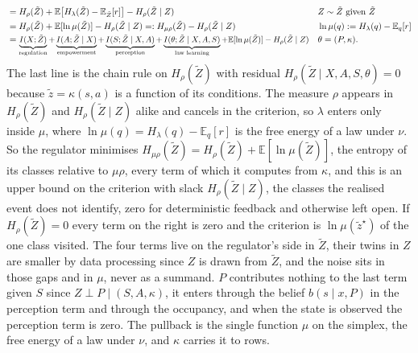 \documentclass[10pt]{article}
\begin{document}
{\begin{align*}
           &= H_\rho(\tilde Z) + \mathbb E\big[H_\lambda(\tilde Z) - \mathbb E_{\tilde Z}[r]\big] - H_\rho(\tilde Z \mid Z) && Z \sim \tilde Z \text{ given } \tilde Z \\
           &= H_\rho(\tilde Z) + \mathbb E[\ln \mu(\tilde Z)] - H_\rho(\tilde Z \mid Z) =: H_{\mu\rho}(\tilde Z) - H_\rho(\tilde Z \mid Z) && \ln \mu(q) := H_\lambda(q) - \mathbb E_q[r] \\
           &= \scalebox{0.92}{$\displaystyle \underbrace{I(X;\tilde Z)}_{\text{regulation}} + \underbrace{I(A;\tilde Z \mid X)}_{\text{empowerment}} + \underbrace{I(S;\tilde Z \mid X,A)}_{\text{perception}} + \underbrace{I(\theta;\tilde Z \mid X,A,S)}_{\text{law learning}} + \mathbb E[\ln \mu(\tilde Z)] - H_\rho(\tilde Z \mid Z)$} && \theta = (P,\kappa).
\end{align*}
The last line is the chain rule on $H_\rho(\tilde Z)$ with residual $H_\rho(\tilde Z \mid X,A,S,\theta) = 0$ because $\tilde z = \kappa(s,a)$ is a function of its conditions.
The measure $\rho$ appears in $H_\rho(\tilde Z)$ and $H_\rho(\tilde Z \mid Z)$ alike and cancels in the criterion, so $\lambda$ enters only inside $\mu$, where $\ln \mu(q) = H_\lambda(q) - \mathbb E_q[r]$ is the free energy of a law under $\nu$.
So the regulator minimises $H_{\mu\rho}(\tilde Z) = H_\rho(\tilde Z) + \mathbb E[\ln \mu(\tilde Z)]$, the entropy of its classes relative to $\mu\rho$, every term of which it computes from $\kappa$, and this is an upper bound on the criterion with slack $H_\rho(\tilde Z \mid Z)$, the classes the realised event does not identify, zero for deterministic feedback and otherwise left open.
If $H_\rho(\tilde Z) = 0$ every term on the right is zero and the criterion is $\ln \mu(\tilde z^\star)$ of the one class visited.
The four terms live on the regulator's side in $\tilde Z$, their twins in $Z$ are smaller by data processing since $Z$ is drawn from $\tilde Z$, and the noise sits in those gaps and in $\mu$, never as a summand.
$P$ contributes nothing to the last term given $S$ since $Z \perp P \mid (S,A,\kappa)$, it enters through the belief $b(s \mid x,P)$ in the perception term and through the occupancy, and when the state is observed the perception term is zero.
The pullback is the single function $\mu$ on the simplex, the free energy of a law under $\nu$, and $\kappa$ carries it to rows.}
\end{document}
